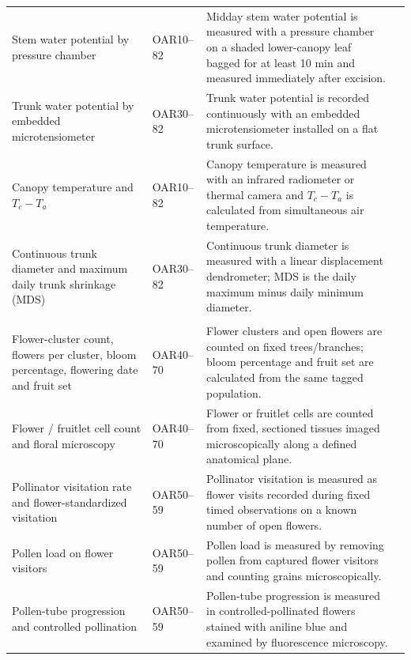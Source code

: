 \begin{landscape}
\begin{longtable}{>{\RaggedRight\arraybackslash}p{5.1cm} >{\RaggedRight\arraybackslash}p{2.3cm} >{\RaggedRight\arraybackslash}p{16.7cm} >{\RaggedRight\arraybackslash}p{2.4cm}}
Stem water potential by pressure chamber &
OAR10--82 &
Midday stem water potential is measured with a pressure chamber on a shaded lower-canopy leaf bagged for at least 10 min and measured immediately after excision. &
\citep{ucanr_pressure_chamber}\\

Trunk water potential by embedded microtensiometer &
OAR30--82 &
Trunk water potential is recorded continuously with an embedded microtensiometer installed on a flat trunk surface. &
\citep{blanco2024}\\

Canopy temperature and $T_c-T_a$ &
OAR10--82 &
Canopy temperature is measured with an infrared radiometer or thermal camera and $T_c-T_a$ is calculated from simultaneous air temperature. &
\citep{blanco2024}\\

Continuous trunk diameter and maximum daily trunk shrinkage (MDS) &
OAR30--82 &
Continuous trunk diameter is measured with a linear displacement dendrometer; MDS is the daily maximum minus daily minimum diameter. &
\citep{blanco2024}\\

\multicolumn{4}{l}{\textbf{Flowering, pollination and flower-bud formation}}\\
Flower-cluster count, flowers per cluster, bloom percentage, flowering date and fruit set &
OAR40--70 &
Flower clusters and open flowers are counted on fixed trees/branches; bloom percentage and fruit set are calculated from the same tagged population. &
\citep{stoeckli2015,serra2016,losada2013}\\

Flower / fruitlet cell count and floral microscopy &
OAR40--70 &
Flower or fruitlet cells are counted from fixed, sectioned tissues imaged microscopically along a defined anatomical plane. &
\citep{losada2013,malladi2010}\\

Pollinator visitation rate and flower-standardized visitation &
OAR50--59 &
Pollinator visitation is measured as flower visits recorded during fixed timed observations on a known number of open flowers. &
\citep{gilpin2022}\\

Pollen load on flower visitors &
OAR50--59 &
Pollen load is measured by removing pollen from captured flower visitors and counting grains microscopically. &
\citep{gilpin2022}\\

Pollen-tube progression and controlled pollination &
OAR50--59 &
Pollen-tube progression is measured in controlled-pollinated flowers stained with aniline blue and examined by fluorescence microscopy. &
\citep{losada2013}\\


\end{longtable}
\end{landscape}
